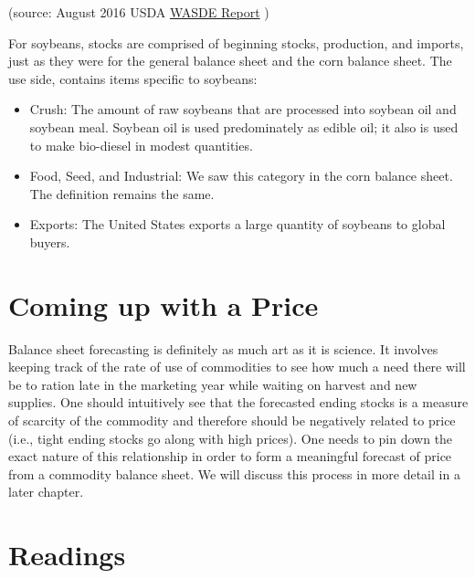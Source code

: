 \documentclass[
]{book}
\providecommand{\tightlist}{%
  \setlength{\itemsep}{0pt}\setlength{\parskip}{0pt}}
\begin{document}
(source: August 2016 USDA \href{http://usda.mannlib.cornell.edu/MannUsda/viewDocumentInfo.do?documentID=1194}{WASDE Report} )

For soybeans, stocks are comprised of beginning stocks, production, and imports, just as they were for the general balance sheet and the corn balance sheet. The use side, contains items specific to soybeans:

\begin{itemize}
\tightlist
\item
  Crush: The amount of raw soybeans that are processed into soybean oil and soybean meal. Soybean oil is used predominately as edible oil; it also is used to make bio-diesel in modest quantities.
\item
  Food, Seed, and Industrial: We saw this category in the corn balance sheet. The definition remains the same.
\item
  Exports: The United States exports a large quantity of soybeans to global buyers.
\end{itemize}

\hypertarget{coming-up-with-a-price}{%
\section{Coming up with a Price}\label{coming-up-with-a-price}}

Balance sheet forecasting is definitely as much art as it is science. It involves keeping track of the rate of use of commodities to see how much a need there will be to ration late in the marketing year while waiting on harvest and new supplies. One should intuitively see that the forecasted ending stocks is a measure of scarcity of the commodity and therefore should be negatively related to price (i.e., tight ending stocks go along with high prices). One needs to pin down the exact nature of this relationship in order to form a meaningful forecast of price from a commodity balance sheet. We will discuss this process in more detail in a later chapter.

\hypertarget{readings-2}{%
\section{Readings}\label{readings-2}}
\end{document}
